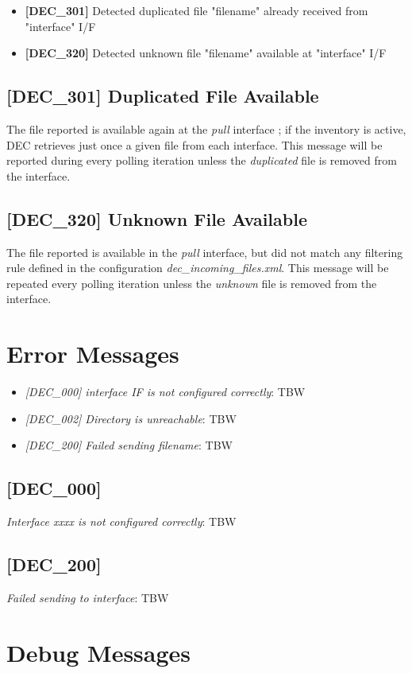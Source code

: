 \documentclass[dec_sum_main.tex]{subfiles}
\begin{document}
\begin{itemize}
	\item \textbf{[DEC\_301]} Detected duplicated file "filename" already received from "interface" I/F
	\item \textbf{[DEC\_320]} Detected unknown file "filename" available at "interface" I/F
\end{itemize}

\subsection{[DEC\_301] Duplicated File Available}
The file reported is available again at the \textit{pull} interface ; if the inventory is active, DEC retrieves just once a given file from each interface. This message will be reported during every polling iteration unless the \textit{duplicated} file is removed from the interface.

\subsection{[DEC\_320] Unknown File Available}
The file reported is available in the \textit{pull} interface, but did not match any filtering rule defined in the configuration \textit{dec\_incoming\_files.xml}. This message will be repeated every polling iteration unless the \textit{unknown} file is removed from the interface.



\section{Error Messages}

\begin{itemize}
	\item \textit{[DEC\_000] \textit{interface} I\/F is not configured correctly}: TBW
	\item \textit{[DEC\_002] Directory is unreachable}: TBW
	\item \textit{[DEC\_200] Failed sending filename}: TBW
\end{itemize}

\subsection{[DEC\_000]}
\textit{Interface xxxx is not configured correctly}: TBW

\subsection{[DEC\_200]}
\textit{Failed sending  to interface}: TBW



\section{Debug Messages}
\end{document}
